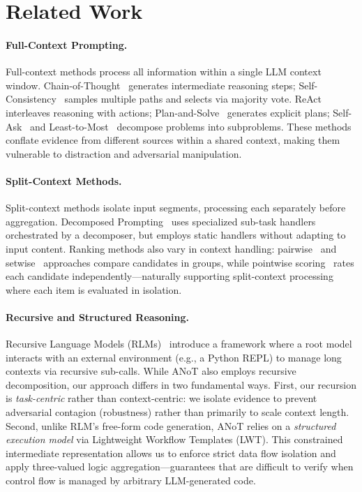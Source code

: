 \section{Related Work}

\paragraph{Full-Context Prompting.}
Full-context methods process all information within a single LLM context window.
Chain-of-Thought~\cite{wei2022chain} generates intermediate reasoning steps;
Self-Consistency~\cite{wang2022self} samples multiple paths and selects via majority vote.
ReAct~\cite{yao2022react} interleaves reasoning with actions; Plan-and-Solve~\cite{wang2023plan} generates explicit plans;
Self-Ask~\cite{press2022measuring} and Least-to-Most~\cite{zhou2022least} decompose problems into subproblems.
These methods conflate evidence from different sources within a shared context, making them vulnerable to distraction and adversarial manipulation.

\paragraph{Split-Context Methods.}
Split-context methods isolate input segments, processing each separately before aggregation.
Decomposed Prompting~\cite{khot2022decomposed} uses specialized sub-task handlers orchestrated by a decomposer, but employs static handlers without adapting to input content.
Ranking methods also vary in context handling: pairwise~\cite{qin2023large} and setwise~\cite{sun2023chatgpt} approaches compare candidates in groups, while pointwise scoring~\cite{liang2022holistic} rates each candidate independently---naturally supporting split-context processing where each item is evaluated in isolation.

\paragraph{Recursive and Structured Reasoning.}
Recursive Language Models (RLMs)~\cite{wang2024recursive} introduce a framework where a root model interacts with an external environment (e.g., a Python REPL) to manage long contexts via recursive sub-calls.
While ANoT also employs recursive decomposition, our approach differs in two fundamental ways.
First, our recursion is \emph{task-centric} rather than context-centric: we isolate evidence to prevent adversarial contagion (robustness) rather than primarily to scale context length.
Second, unlike RLM's free-form code generation, ANoT relies on a \emph{structured execution model} via Lightweight Workflow Templates (LWT).
This constrained intermediate representation allows us to enforce strict data flow isolation and apply three-valued logic aggregation—guarantees that are difficult to verify when control flow is managed by arbitrary LLM-generated code.


